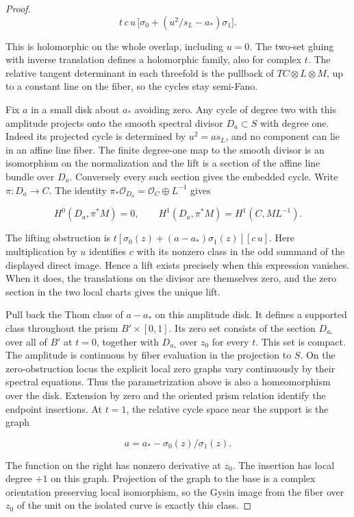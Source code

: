 \begin{proof}
\[
     t\,c\,u\,
          \big[\sigma_0+(u^2/s_L-a_*)\sigma_1\big].
\]

This is holomorphic on the whole overlap, including $u=0$.
The two-set gluing with inverse translation defines a holomorphic
family, also for complex $t$. The relative tangent determinant
in each threefold is the pullback of $TC\otimes L\otimes M$, up
to a constant line on the fiber, so the cycles stay semi-Fano.

Fix $a$ in a small disk about $a_*$ avoiding zero. Any cycle
of degree two with this amplitude projects onto the smooth
spectral divisor $D_a\subset S$ with degree one. Indeed its
projected cycle is determined by $u^2=a s_L$, and no component
can lie in an affine line fiber. The finite degree-one map to the
smooth divisor is an isomorphism on the normalization and the lift
is a section of the affine line bundle over $D_a$. Conversely
every such section gives the embedded cycle. Write
$\pi:D_a\to C$. The identity
$\pi_*\mathcal O_{D_a}=\mathcal O_C\oplus L^{-1}$ gives

\[
   H^0(D_a,\pi^*M)=0,\qquad
   H^1(D_a,\pi^*M)=H^1(C,ML^{-1}) .
\]

The lifting obstruction is
$t[\sigma_0(z)+(a-a_*)\sigma_1(z)] [c\,u]$.
Here multiplication by $u$ identifies $c$ with its nonzero
class in the odd summand of the displayed direct image. Hence a
lift exists precisely when this expression vanishes. When it does,
the translations on the divisor are themselves zero, and the zero
section in the two local charts gives the unique lift.

Pull back the Thom class of $a-a_*$ on this amplitude disk. It
defines a supported class throughout the prism $B'\times[0,1]$.
Its zero set consists of the section $D_{a_*}$ over all of $B'$
at $t=0$, together with $D_{a_*}$ over $z_0$ for every $t$.
This set is compact. The amplitude is continuous by fiber
evaluation in the projection to $S$. On the zero-obstruction
locus the explicit local zero graphs vary continuously by their
spectral equations. Thus the parametrization above is also a
homeomorphism over the disk. Extension by zero and the oriented
prism relation identify the endpoint insertions. At $t=1$, the
relative cycle space near the support is the graph

\[
                  a=a_*-\sigma_0(z)/\sigma_1(z).
\]

The function on the right has nonzero derivative at $z_0$.
The insertion has local degree $+1$ on this graph. Projection
of the graph to the base is a complex orientation preserving local
isomorphism, so the Gysin image from the fiber over $z_0$ of the
unit on the isolated curve is exactly this class.


\end{proof}
